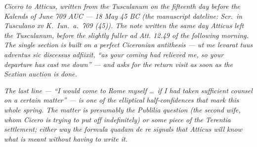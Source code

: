 
\textit{Cicero to Atticus, written from the Tusculanum
on the fifteenth day before the Kalends of June 709
AUC --- 18 May 45 BC (the manuscript dateline:
\textit{Scr.\ in Tusculano xv K.\ Iun.\ a.\ 709
(45)}). The note written the same day Atticus left
the Tusculanum, before the slightly fuller \textit{ad
Att.} 12.49 of the following morning. The single
section is built on a perfect Ciceronian antithesis
--- \textit{ut me levarat tuus adventus sic discessus
adfiixit}, ``as your coming had relieved me, so your
departure has cast me down'' --- and asks for the
return visit as soon as the Sextian auction is done.}

\textit{The last line --- ``I would come to Rome
myself \dots\ if I had taken sufficient counsel on a
certain matter'' --- is one of the elliptical
half-confidences that mark this whole spring. The
matter is presumably the Publilia question (the
second wife, whom Cicero is trying to put off
indefinitely) or some piece of the Terentia
settlement; either way the formula \textit{quadam de
re} signals that Atticus will know what is meant
without having to write it.}
